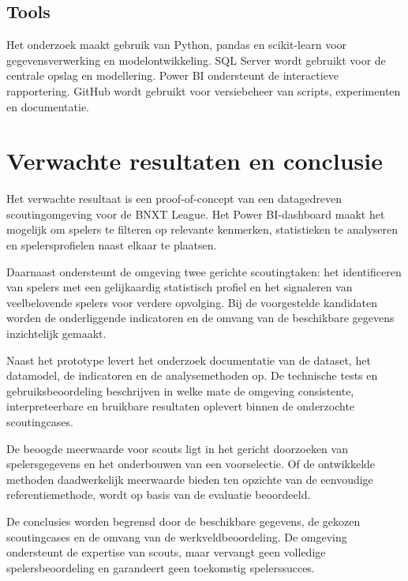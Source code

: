 \subsection{Tools}

Het onderzoek maakt gebruik van Python, pandas en scikit-learn voor gegevensverwerking en modelontwikkeling. SQL Server wordt gebruikt voor de centrale opslag en modellering. Power BI ondersteunt de interactieve rapportering. GitHub wordt gebruikt voor versiebeheer van scripts, experimenten en documentatie.

\section{Verwachte resultaten en conclusie}%
\label{sec:verwachte_resultaten}

Het verwachte resultaat is een proof-of-concept van een datagedreven scoutingomgeving voor de BNXT League. Het Power BI-dashboard maakt het mogelijk om spelers te filteren op relevante kenmerken, statistieken te analyseren en spelersprofielen naast elkaar te plaatsen.

Daarnaast ondersteunt de omgeving twee gerichte scoutingtaken: het identificeren van spelers met een gelijkaardig statistisch profiel en het signaleren van veelbelovende spelers voor verdere opvolging. Bij de voorgestelde kandidaten worden de onderliggende indicatoren en de omvang van de beschikbare gegevens inzichtelijk gemaakt.

Naast het prototype levert het onderzoek documentatie van de dataset, het datamodel, de indicatoren en de analysemethoden op. De technische tests en gebruiksbeoordeling beschrijven in welke mate de omgeving consistente, interpreteerbare en bruikbare resultaten oplevert binnen de onderzochte scoutingcases.

De beoogde meerwaarde voor scouts ligt in het gericht doorzoeken van spelersgegevens en het onderbouwen van een voorselectie. Of de ontwikkelde methoden daadwerkelijk meerwaarde bieden ten opzichte van de eenvoudige referentiemethode, wordt op basis van de evaluatie beoordeeld.

De conclusies worden begrensd door de beschikbare gegevens, de gekozen scoutingcases en de omvang van de werkveldbeoordeling. De omgeving ondersteunt de expertise van scouts, maar vervangt geen volledige spelersbeoordeling en garandeert geen toekomstig spelerssucces.